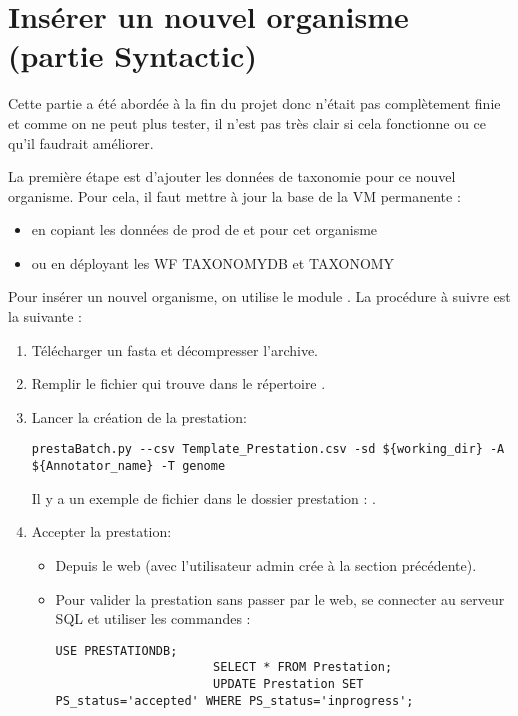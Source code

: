 \section{Insérer un nouvel organisme (partie Syntactic)} \label{sec:syntactic}

\begin{warningbox}
    Cette partie a été abordée à la fin du projet donc n'était pas complètement finie
    et comme on ne peut plus tester, il n'est pas très clair si cela fonctionne
    ou ce qu'il faudrait améliorer.
\end{warningbox}

La première étape est d'ajouter les données de taxonomie pour ce nouvel organisme.
Pour cela, il faut mettre à jour la base  de la VM permanente :
\begin{itemize}
    \item en copiant les données de prod de  et  pour cet organisme
    \item ou en déployant les WF TAXONOMYDB et TAXONOMY
\end{itemize}

Pour insérer un nouvel organisme, on utilise le module .
La procédure à suivre est la suivante :
\begin{enumerate}
    \item Télécharger un fasta et décompresser l'archive.
    \item Remplir le fichier  qui trouve dans le répertoire .
    \item Lancer la création de la prestation:
          \begin{lstlisting}[style=bash,gobble=14]
              prestaBatch.py --csv Template_Prestation.csv -sd ${working_dir} -A ${Annotator_name} -T genome
          \end{lstlisting}
          Il y a un exemple de fichier  dans le dossier prestation : .
    \item Accepter la prestation:
          \begin{itemize}
              \item Depuis le web (avec l'utilisateur admin crée à la section précédente).
              \item Pour valider la prestation sans passer par le web, se connecter au serveur SQL et utiliser les commandes :
                    \begin{lstlisting}[style=SQL,gobble=22]
                      USE PRESTATIONDB;
                      SELECT * FROM Prestation;
                      UPDATE Prestation SET PS_status='accepted' WHERE PS_status='inprogress';
                  \end{lstlisting}
           \end{itemize}
\end{enumerate}

